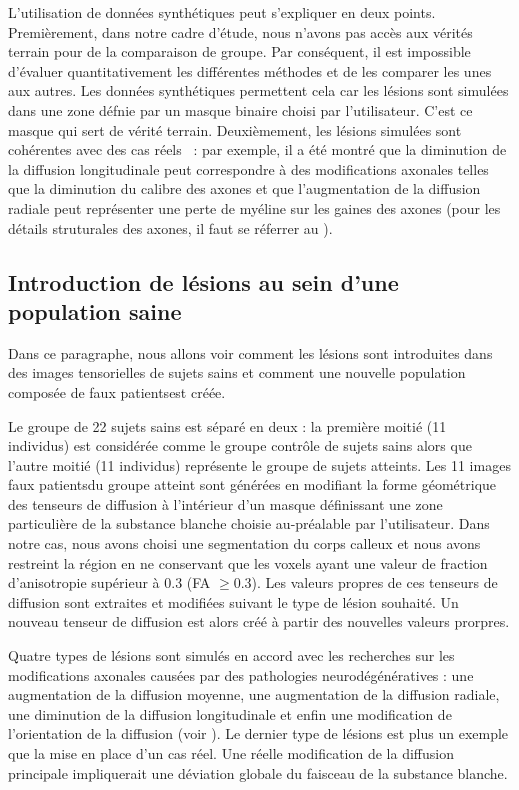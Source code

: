 L'utilisation de données synthétiques peut s'expliquer en deux points.
Premièrement, dans notre cadre d'étude, nous n'avons pas accès aux vérités terrain pour de la comparaison de groupe.
Par conséquent, il est impossible d'évaluer quantitativement les différentes méthodes et de les comparer les unes aux autres.
Les données synthétiques permettent cela car les lésions sont simulées dans une zone défnie par un masque binaire choisi par l'utilisateur.
C'est ce masque qui sert de vérité terrain.
Deuxièmement, les lésions simulées sont cohérentes avec des cas réels~\cite{Harsan2006} : 
par exemple, il a été montré que la diminution de la diffusion longitudinale peut correspondre à des modifications axonales 
telles que la diminution du calibre des axones
et que l'augmentation de la diffusion radiale peut représenter une perte de myéline sur les gaines des axones 
(pour les détails struturales des axones, il faut se réferrer au ).


\subsection{Introduction de lésions au sein d'une population saine}
Dans ce paragraphe, nous allons voir comment les lésions sont introduites dans des images tensorielles de sujets sains 
et comment une nouvelle population composée de \og faux patients\fg est créée.

Le groupe de 22 sujets sains est séparé en deux : 
la première moitié (11 individus) est considérée comme le groupe contrôle de sujets sains alors que l'autre moitié (11 individus) représente le groupe de sujets atteints.
Les 11 images \og faux patients\fg du groupe atteint sont générées en modifiant la forme géométrique des tenseurs de diffusion 
à l'intérieur d'un masque définissant une zone particulière de la substance blanche choisie au-préalable par l'utilisateur.
Dans notre cas, nous avons choisi une segmentation du corps calleux et nous avons restreint la région en ne conservant que 
les voxels ayant une valeur de fraction d'anisotropie supérieur à $0.3$ (FA $\geq 0.3$). 
Les valeurs propres de ces tenseurs de diffusion sont extraites et modifiées suivant le type de lésion souhaité.
Un nouveau tenseur de diffusion est alors créé à partir des nouvelles valeurs prorpres.

Quatre types de lésions sont simulés en accord avec les recherches sur les modifications axonales causées par des pathologies neurodégénératives \cite{Harsan2006} : 
une augmentation de la diffusion moyenne, une augmentation de la diffusion radiale, une diminution de la diffusion longitudinale 
et enfin une modification de l'orientation de la diffusion (voir ).
Le dernier type de lésions est plus un exemple que la mise en place d'un cas réel.
Une réelle modification de la diffusion principale impliquerait une déviation globale du faisceau de la substance blanche.

